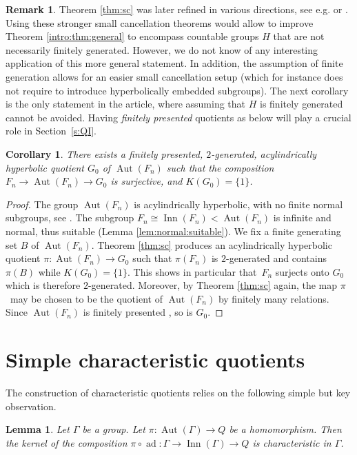 \documentclass[JEP,XML,SOM,Unicode]{cedram}
\newtheorem{corollary}[theorem]{Corollary}
\newtheorem{lemma}[theorem]{Lemma}
\theoremstyle{definition}
\newtheorem{remark}[theorem]{Remark}
\newcommand{\Aut}{\operatorname{Aut}}
\newcommand{\Inn}{\operatorname{Inn}}
\newcommand{\ad}{\operatorname{ad}}
\begin{document}
\begin{remark}
Theorem \ref{thm:sc} was later refined in various directions, see e.g. \cite[Prop.\,3.3]{hull:improved} or \cite[Th.\,3.27]{CIOS}. Using these stronger small cancellation theorems would allow to improve Theorem \ref{intro:thm:general} to encompass countable groups $H$ that are not necessarily finitely generated. However, we do not know of any interesting application of this more general statement.
In addition, the assumption of finite generation allows for an easier small cancellation setup (which for instance does not require to introduce hyperbolically embedded subgroups).
The next corollary is the only statement in the article, where assuming that $H$ is finitely generated cannot be avoided.
Having \emph{finitely presented} quotients as below will play a crucial role in Section~\ref{s:QI}.
\end{remark}

\begin{corollary}
\label{lem:fp}
There exists a finitely presented, $2$-generated, acylindrically hyperbolic quotient $G_0$ of $\Aut(F_n)$ such that the composition $F_n \to \Aut(F_n) \to G_0$ is surjective, and $K(G_0) = \{ 1 \}$.
\end{corollary}

\begin{proof}
The group $\Aut(F_n)$ is acylindrically hyperbolic, with no finite normal subgroups, see \cite{auto:infend}.
The subgroup $F_n \cong \Inn(F_n) < \Aut(F_n)$ is infinite and normal, thus suitable (Lemma \ref{lem:normal:suitable}). We fix a finite generating set $B$ of $\Aut(F_n)$. Theorem \ref{thm:sc} produces an acylindrically hyperbolic quotient $\pi : \Aut(F_n) \to G_0$ such that $\pi(F_n)$ is $2$-generated and contains $\pi(B)$ while $K(G_0) = \{1\}$.
This shows in particular that~$F_n$ surjects onto $G_0$ which is therefore $2$-generated.
Moreover, by Theorem \ref{thm:sc} again, the map $\pi$~may be chosen to be the quotient of $\Aut(F_n)$ by finitely many relations.
Since $\Aut(F_n)$ is finitely presented \cite{nielsen}, so is $G_0$.
\end{proof}

\section{Simple characteristic quotients}

The construction of characteristic quotients relies on the following simple but key observation.

\begin{lemma}
\label{lem:char}
Let $\Gamma$ be a group.
Let $\pi : \Aut(\Gamma) \to Q$ be a homomorphism.
Then the kernel of the composition $\pi \circ \ad : \Gamma \to \Inn(\Gamma) \to Q$ is characteristic in $\Gamma$.
\end{lemma}
\end{document}
